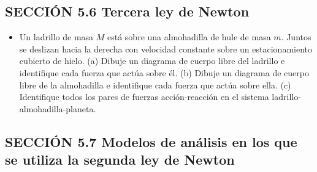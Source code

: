 \documentclass[11pt,a4paper]{article}
\begin{document}
\subsection*{SECCIÓN 5.6 Tercera ley de Newton}

\begin{itemize}
    \item[\textbf{14.}] Un ladrillo de masa $M$ está sobre una almohadilla de hule de masa $m$. Juntos se deslizan hacia la derecha con velocidad constante sobre un estacionamiento cubierto de hielo. (a) Dibuje un diagrama de cuerpo libre del ladrillo e identifique cada fuerza que actúa sobre él. (b) Dibuje un diagrama de cuerpo libre de la almohadilla e identifique cada fuerza que actúa sobre ella. (c) Identifique todos los pares de fuerzas acción-reacción en el sistema ladrillo-almohadilla-planeta.
    \vspace*{7cm}
\end{itemize}

\newpage

\subsection*{SECCIÓN 5.7 Modelos de análisis en los que se utiliza la segunda ley de Newton}
\end{document}
